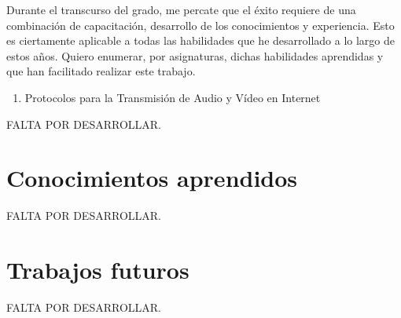 \documentclass[a4paper, 12pt]{book}
\begin{document}
Durante el transcurso del grado, me percate que el éxito requiere de una combinación de capacitación, desarrollo de los conocimientos y experiencia. Esto es ciertamente aplicable a todas las habilidades que he desarrollado a lo largo de estos años. Quiero enumerar, por asignaturas, dichas habilidades aprendidas y que han facilitado realizar este trabajo.

\begin{enumerate}
  \item Protocolos para la Transmisión de Audio y Vídeo en Internet
\end{enumerate}

FALTA POR DESARROLLAR.

\section{Conocimientos aprendidos}
\label{sec:aprendizaje}

FALTA POR DESARROLLAR.


\section{Trabajos futuros}
\label{sec:trabajos_futuros}

FALTA POR DESARROLLAR.





\cleardoublepage



\end{document}
